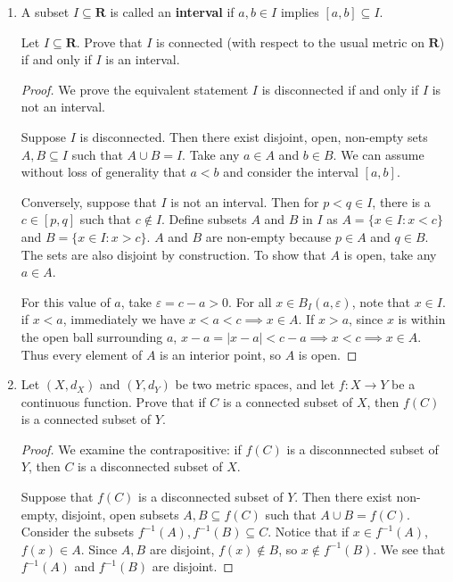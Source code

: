 \documentclass{article}
\newcommand{\R}{\mathbf{R}}
\theoremstyle{plain} %
\numberwithin{thm}{section} %
\theoremstyle{definition}
\begin{document}
    \begin{enumerate}[label=(\alph*)]
        \item A subset $I\subseteq \R$ is called an \textbf{interval} if $a,b\in I$ implies $[a,b]\subseteq I$.

        Let $I\subseteq \R$. Prove that $I$ is connected (with respect to the usual metric on $\R$) if and only if $I$ is an interval.
        
        \begin{proof}
            We prove the equivalent statement \(I\) is disconnected if and only if \(I\) is not an interval.

            Suppose \(I\) is disconnected. Then there exist disjoint, open, non-empty sets \(A,B \subseteq I\) such that \(A \cup B = I\). Take any \(a \in A\) and \(b \in B\). We can assume without loss of generality that \(a<b\) and consider the interval \([a,b]\).

            Conversely, suppose that \(I\) is not an interval. Then for \(p<q \in I\), there is a \(c \in [p,q]\) such that \(c \notin I\). Define subsets \(A\) and \(B\) in \(I\) as \(A = \{x\in I \colon x < c\}\) and \(B = \{x\in I \colon x > c\}\). \(A\) and \(B\) are non-empty because \(p \in A\) and \(q \in B\). The sets are also disjoint by construction. To show that \(A\) is open, take any \(a \in A\).
            
            For this value of \(a\), take \(\varepsilon = c - a > 0\). For all \(x \in B_I(a, \varepsilon)\), note that \(x \in I\). if \(x < a\), immediately we have \(x < a < c \implies x \in A\). If \(x >a\), since \(x\) is within the open ball surrounding \(a\), \(x-a = |x-a| < c-a \implies x<c \implies x\in A\). Thus every element of \(A\) is an interior point, so \(A\) is open.

        \end{proof}

        \item Let $(X,d_X)$ and $(Y,d_Y)$ be two metric spaces, and let $f:X\rightarrow Y$ be a continuous function. Prove that if $C$ is a connected subset of $X$, then $f(C)$ is a connected subset of $Y$.
        
        \begin{proof}
            We examine the contrapositive: if \(f(C)\) is a disconnnected subset of \(Y\), then \(C\) is a disconnected subset of \(X\).

            Suppose that \(f(C)\) is a disconnected subset of \(Y\). Then there exist non-empty, disjoint, open subsets \(A,B \subseteq f(C)\) such that \(A \cup B = f(C)\). Consider the subsets \(f^{-1} (A), f^{-1} (B) \subseteq C\). Notice that if \(x \in f^{-1} (A)\), \(f(x) \in A\). Since \(A,B\) are disjoint, \(f(x) \notin B\), so \(x \notin f^{-1} (B)\). We see that \(f^{-1} (A)\) and \(f^{-1} (B)\) are disjoint.
            

\end{proof}
\end{enumerate}
\end{document}

